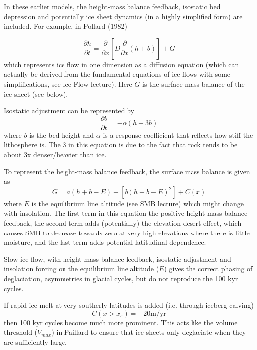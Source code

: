 \documentclass[12pt]{article}
\theoremstyle{definition}
\newcommand{\pd}[2]{\frac{\partial {#1}}{\partial {#2}}}
\begin{document}
In these earlier models, the height-mass balance feedback, isostatic bed depression and potentially ice sheet dynamics (in a highly simplified form) are included. For example, in Pollard (1982)
\begin{shaded}
\begin{equation}
\pd{h}{t} = \pd{}{x} \left[D \pd{}{x} \left(h+b \right) \right] + G
\end{equation}
which represents ice flow in one dimension as a diffusion equation (which can actually be derived from the fundamental equations of ice flows with some simplifications, see Ice Flow lecture). Here $G$ is the surface mass balance of the ice sheet (see below).

Isostatic adjustment can be represented by
\begin{equation}
\pd{b}{t} = - \alpha (h+3b)
\end{equation}
where $b$ is the bed height and $\alpha$ is a response coefficient that reflects how stiff the lithosphere is. The 3 in this equation is due to the fact that rock tends to be about 3x denser/heavier than ice.

To represent the height-mass balance feedback, the surface mass balance is given as
\begin{equation}
G = a(h+b-E) + [b(h+b-E)^2] + C(x)
\end{equation}
where $E$ is the equilibrium line altitude (see SMB lecture) which might change with insolation. The first term in this equation the positive height-mass balance feedback, the second term adds (potentially) the elevation-desert effect, which causes SMB to decrease towards zero at very high elevations where there is little moisture, and the last term adds potential latitudinal dependence.
\end{shaded}
Slow ice flow, with height-mass balance feedback, isostatic adjustment and insolation forcing on the equilibrium line altitude ($E$) gives the correct phasing of deglaciation, asymmetries in glacial cycles, but do not reproduce the 100 kyr cycles.

If rapid ice melt at very southerly latitudes is added (i.e. through iceberg calving)
\begin{equation}
C(x>x_s) = -20 \text{m/yr}
\end{equation}
then 100 kyr cycles become much more prominent. This acts like the volume threshold ($V_{max}$) in Paillard to ensure that ice sheets only deglaciate when they are sufficiently large.
\end{document}
